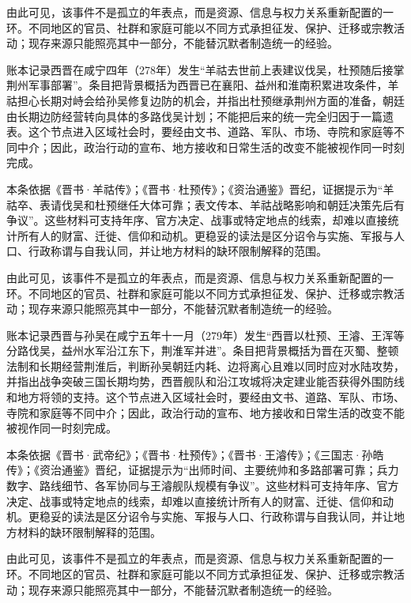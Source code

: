 由此可见，该事件不是孤立的年表点，而是资源、信息与权力关系重新配置的一环。不同地区的官员、社群和家庭可能以不同方式承担征发、保护、迁移或宗教活动；现存来源只能照亮其中一部分，不能替沉默者制造统一的经验。

账本记录西晋在咸宁四年（278年）发生“羊祜去世前上表建议伐吴，杜预随后接掌荆州军事部署”。条目把背景概括为西晋已在襄阳、益州和淮南积累进攻条件，羊祜担心长期对峙会给孙吴修复边防的机会，并指出杜预继承荆州方面的准备，朝廷由长期边防经营转向具体的多路伐吴计划；不能把后来的统一完全归因于一篇遗表。这个节点进入区域社会时，要经由文书、道路、军队、市场、寺院和家庭等不同中介；因此，政治行动的宣布、地方接收和日常生活的改变不能被视作同一时刻完成。

本条依据《晋书·羊祜传》；《晋书·杜预传》；《资治通鉴》晋纪，证据提示为“羊祜卒、表请伐吴和杜预继任大体可靠；表文传本、羊祜战略影响和朝廷决策先后有争议”。这些材料可支持年序、官方决定、战事或特定地点的线索，却难以直接统计所有人的财富、迁徙、信仰和动机。更稳妥的读法是区分诏令与实施、军报与人口、行政称谓与自我认同，并让地方材料的缺环限制解释的范围。

由此可见，该事件不是孤立的年表点，而是资源、信息与权力关系重新配置的一环。不同地区的官员、社群和家庭可能以不同方式承担征发、保护、迁移或宗教活动；现存来源只能照亮其中一部分，不能替沉默者制造统一的经验。

账本记录西晋与孙吴在咸宁五年十一月（279年）发生“西晋以杜预、王濬、王浑等分路伐吴，益州水军沿江东下，荆淮军并进”。条目把背景概括为晋在灭蜀、整顿法制和长期经营荆淮后，判断孙吴朝廷内耗、边将离心且难以同时应对水陆攻势，并指出战争突破三国长期均势，西晋舰队和沿江攻城将决定建业能否获得外围防线和地方将领的支持。这个节点进入区域社会时，要经由文书、道路、军队、市场、寺院和家庭等不同中介；因此，政治行动的宣布、地方接收和日常生活的改变不能被视作同一时刻完成。

本条依据《晋书·武帝纪》；《晋书·杜预传》；《晋书·王濬传》；《三国志·孙皓传》；《资治通鉴》晋纪，证据提示为“出师时间、主要统帅和多路部署可靠；兵力数字、路线细节、各军协同与王濬舰队规模有争议”。这些材料可支持年序、官方决定、战事或特定地点的线索，却难以直接统计所有人的财富、迁徙、信仰和动机。更稳妥的读法是区分诏令与实施、军报与人口、行政称谓与自我认同，并让地方材料的缺环限制解释的范围。

由此可见，该事件不是孤立的年表点，而是资源、信息与权力关系重新配置的一环。不同地区的官员、社群和家庭可能以不同方式承担征发、保护、迁移或宗教活动；现存来源只能照亮其中一部分，不能替沉默者制造统一的经验。


